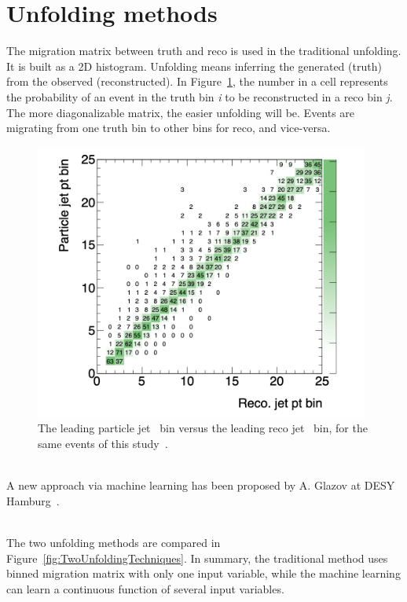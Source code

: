\section{Unfolding methods}
\label{sec:UnfoldingMethods}

The migration matrix between truth and reco is used in the traditional unfolding. It is built as a 2D histogram. Unfolding means inferring the generated (truth) from the observed (reconstructed). In Figure~\ref{fig:MigrationMatrix}, the number in a cell represents the probability of an event in the truth bin \emph{i} to be reconstructed in a reco bin \emph{j}. The more diagonalizable matrix, the easier unfolding will be. Events are migrating from one truth bin to other bins for reco, and vice-versa.

\begin{figure}[h]
  \centering
  \includegraphics[width=0.98\textwidth]{../presentation/plots/jetPt_migration_matrix.png}
  \caption{The leading particle jet \pt~bin versus the leading reco jet \pt~bin, for the same events of this study~\cite{ReportYichenLi}.}
  \label{fig:MigrationMatrix}
\end{figure}

\ \\A new approach via machine learning has been proposed by A. Glazov at DESY Hamburg~\cite{AGlazov}.

\ \\The two unfolding methods are compared in Figure~\ref{fig:TwoUnfoldingTechniques}. In summary, the traditional method uses binned migration matrix with only one input variable, while the machine learning can learn a continuous function of several input variables.

